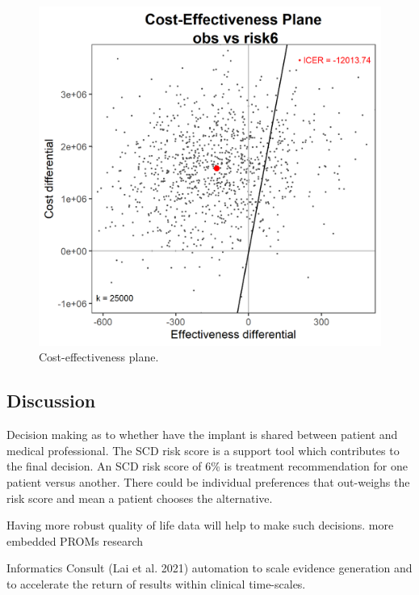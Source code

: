 \documentclass[
]{article}
\begin{document}
\begin{figure}

{\centering \includegraphics[width=19.22in]{../../images/ceplane} 

}

\caption{Cost-effectiveness plane.}\label{fig:ceplane}
\end{figure}

\hypertarget{discussion}{%
\subsection{Discussion}\label{discussion}}

Decision making as to whether have the implant is shared between patient and medical professional.
The SCD risk score is a support tool which contributes to the final decision.
An SCD risk score of 6\% is treatment recommendation for one patient versus another.
There could be individual preferences that out-weighs the risk score and mean a patient chooses the alternative.

Having more robust quality of life data will help to make such decisions.
more embedded PROMs research

Informatics Consult (Lai et al. 2021) automation to scale evidence generation and to accelerate the return of results within clinical time-scales.
\end{document}
